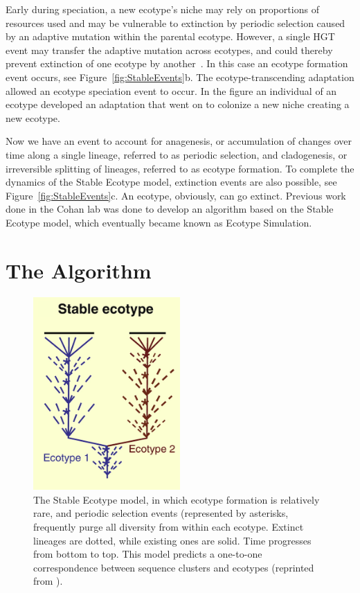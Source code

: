 Early during speciation, a new ecotype's niche may rely on proportions of resources used and may be vulnerable to extinction by periodic selection caused by an adaptive mutation within the parental ecotype.
However, a single HGT event may transfer the adaptive mutation across ecotypes, and could thereby prevent extinction of one ecotype by another~\cite{cohan2008origins}.
In this case an ecotype formation event occurs, see Figure~\ref{fig:StableEvents}b.
The ecotype-transcending adaptation allowed an ecotype speciation event to occur. In the figure an individual of an ecotype developed an adaptation that went on to colonize a new niche creating a new ecotype.

Now we have an event to account for anagenesis, or accumulation of changes over time along a single lineage, referred to as periodic selection, and cladogenesis, or irreversible splitting of lineages, referred to as ecotype formation.
To complete the dynamics of the Stable Ecotype model, extinction events are also possible, see Figure~\ref{fig:StableEvents}c.
An ecotype, obviously, can go extinct.
Previous work done in the Cohan lab was done to develop an algorithm based on the Stable Ecotype model, which eventually became known as Ecotype Simulation.


\section{The Algorithm}

\begin{figure}
 \caption[Phylogenetic tree representation of typical Stable Ecotype model case.]{ The Stable Ecotype model, in which ecotype formation is relatively rare, and periodic selection events (represented by asterisks, frequently purge all diversity from within each ecotype. Extinct lineages are dotted, while existing ones are solid. Time progresses from bottom to top. This model predicts a one-to-one correspondence between sequence clusters and ecotypes (reprinted from \protect\cite{cohan2008origins}). }
 \centering
 \label{fig:StableTree}
 \includegraphics[width=0.5\textwidth]{images/StableTree-CH2}
\end{figure}

